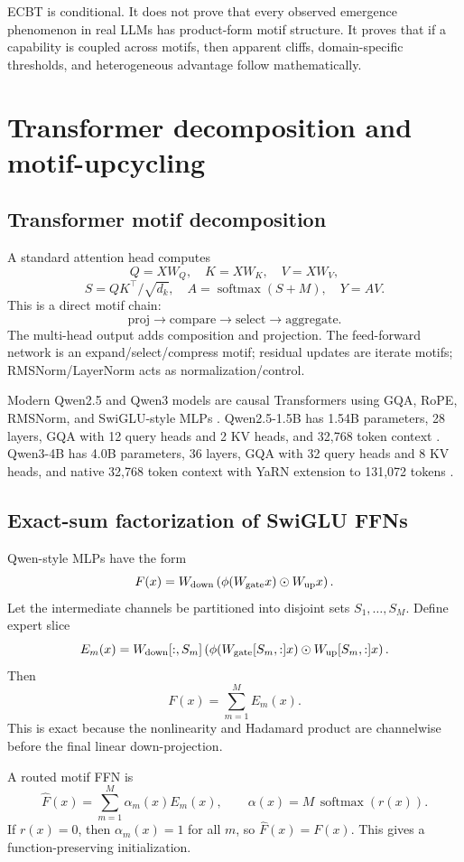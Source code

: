 \documentclass[11pt]{article}
\theoremstyle{definition}
\newcommand{\softmax}{\operatorname{softmax}}
\begin{document}
ECBT is conditional. It does not prove that every observed emergence phenomenon in real LLMs has product-form motif structure. It proves that if a capability is coupled across motifs, then apparent cliffs, domain-specific thresholds, and heterogeneous advantage follow mathematically.

\section{Transformer decomposition and motif-upcycling}

\subsection{Transformer motif decomposition}

A standard attention head computes
\[
Q=XW_Q,
\quad K=XW_K,
\quad V=XW_V,
\]
\[
S=QK^\top/\sqrt{d_k},
\quad A=\softmax(S+M),
\quad Y=AV.
\]
This is a direct motif chain:
\[
\mathrm{proj}\rightarrow \mathrm{compare}\rightarrow \mathrm{select}\rightarrow \mathrm{aggregate}.
\]
The multi-head output adds composition and projection. The feed-forward network is an expand/select/compress motif; residual updates are iterate motifs; RMSNorm/LayerNorm acts as normalization/control.

Modern Qwen2.5 and Qwen3 models are causal Transformers using GQA, RoPE, RMSNorm, and SwiGLU-style MLPs \cite{qwen25model,qwen3model,qwen2hf}. Qwen2.5-1.5B has 1.54B parameters, 28 layers, GQA with 12 query heads and 2 KV heads, and 32,768 token context \cite{qwen25model}. Qwen3-4B has 4.0B parameters, 36 layers, GQA with 32 query heads and 8 KV heads, and native 32,768 token context with YaRN extension to 131,072 tokens \cite{qwen3model}.

\subsection{Exact-sum factorization of SwiGLU FFNs}

Qwen-style MLPs have the form
\[
F(x)=W_{\rm down}\left(\phi(W_{\rm gate}x)\odot W_{\rm up}x\right).
\]
Let the intermediate channels be partitioned into disjoint sets \(S_1,\ldots,S_M\). Define expert slice
\[
E_m(x)=W_{\rm down}[:,S_m]
\left(
\phi(W_{\rm gate}[S_m,:]x)\odot W_{\rm up}[S_m,:]x
\right).
\]
Then
\[
F(x)=\sum_{m=1}^M E_m(x).
\]
This is exact because the nonlinearity and Hadamard product are channelwise before the final linear down-projection.

A routed motif FFN is
\[
\widehat F(x)=\sum_{m=1}^M\alpha_m(x)E_m(x),
\qquad
\alpha(x)=M\,\softmax(r(x)).
\]
If \(r(x)=0\), then \(\alpha_m(x)=1\) for all \(m\), so \(\widehat F(x)=F(x)\). This gives a function-preserving initialization.
\end{document}
